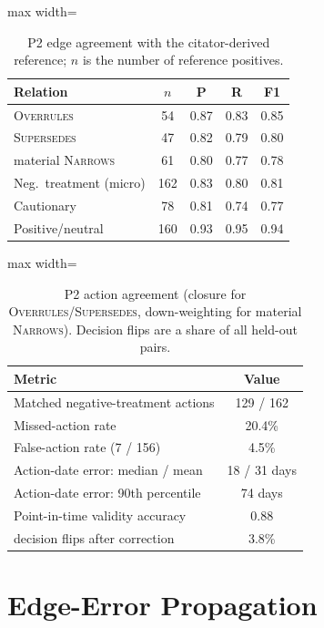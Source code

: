 \begin{table}[h]
\centering
\small
\begin{adjustbox}{max width=\columnwidth}
\begin{tabular}{lcccc}
\toprule
Relation & $n$ & P & R & F1 \\
\midrule
\textsc{Overrules} & 54 & 0.87 & 0.83 & 0.85 \\
\textsc{Supersedes} & 47 & 0.82 & 0.79 & 0.80 \\
material \textsc{Narrows} & 61 & 0.80 & 0.77 & 0.78 \\
Neg.\ treatment (micro) & 162 & 0.83 & 0.80 & 0.81 \\
Cautionary & 78 & 0.81 & 0.74 & 0.77 \\
Positive/neutral & 160 & 0.93 & 0.95 & 0.94 \\
\bottomrule
\end{tabular}
\end{adjustbox}
\caption{P2 edge agreement with the citator-derived reference; $n$ is the number of reference positives.}
\label{tab:p2_edge}
\end{table}

\begin{table}[h]
\centering
\small
\begin{adjustbox}{max width=\columnwidth}
\begin{tabular}{lc}
\toprule
Metric & Value \\
\midrule
Matched negative-treatment actions & 129 / 162 \\
Missed-action rate & 20.4\% \\
False-action rate (7 / 156) & 4.5\% \\
Action-date error: median / mean & 18 / 31 days \\
Action-date error: 90th percentile & 74 days \\
Point-in-time validity accuracy & 0.88 \\
\plre{} decision flips after correction & 3.8\% \\
\bottomrule
\end{tabular}
\end{adjustbox}
\caption{P2 action agreement (closure for \textsc{Overrules}/\textsc{Supersedes}, down-weighting for material \textsc{Narrows}). Decision flips are a share of all held-out \plre{} pairs.}
\label{tab:p2_closure}
\end{table}

\section{Edge-Error Propagation}
\label{app:propagation}


